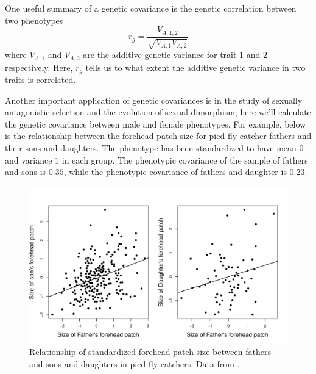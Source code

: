 One useful summary of a genetic covariance is the genetic correlation between two phenotypes
\begin{equation}
r_g = \frac{V_{A,1,2}}{\sqrt{V_{A,1}V_{A,2}}}
\end{equation}
where $V_{A,1}$ and $V_{A,2}$ are the additive genetic variance for trait 1 and 2 respectively. Here, $r_g$ tells us to what extent the additive genetic variance in two traits is correlated.   



Another important application of genetic covariances is in the
study of sexually antagonistic selection and the evolution of sexual
dimorphism; here we'll calculate the genetic covariance between male
and female phenotypes. For example, below is the relationship between
the forehead patch size for pied fly-catcher fathers and their sons and daughters. The phenotype has been standardized to have mean $0$  and variance $1$ in each group. The phenotypic covariance of the sample of fathers and sons is $0.35$, while the phenotypic covariance of fathers and daughter is $0.23$. 



\begin{figure}
\begin{center}
\includegraphics[width= \textwidth]{Journal_figs/Quant_gen/pied_fly_catcher_sex_genetic_corr/FlyCatcher_genetic_corr.pdf}
\end{center}
\caption{Relationship of standardized forehead patch size between
  fathers and sons and daughters in  pied fly-catchers. Data from
  \citeauthor{potti:11}. } \label{fig:FlyCatcher_genetic_corr}   %
\end{figure}

